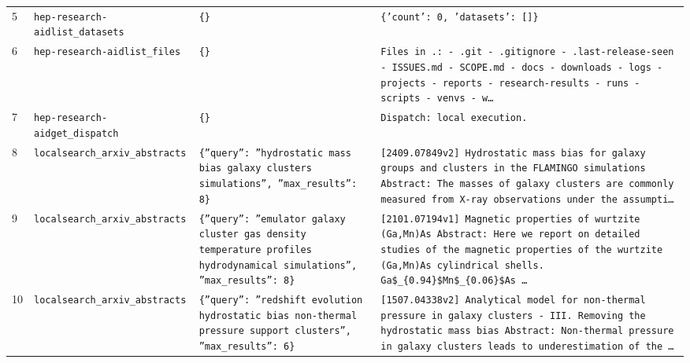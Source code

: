 \documentclass[11pt,a4paper]{article}
\begin{document}
\begin{longtable}{@{}p{}p{}p{}p{}@{}}
5 & \texttt{hep-research-aid}\newline\texttt{list\_\allowbreak{}datasets} & \texttt{\{\}\allowbreak{}} & \texttt{\{'count':\allowbreak{} 0,\allowbreak{} 'datasets':\allowbreak{} []\allowbreak{}\}\allowbreak{}} \\
6 & \texttt{hep-research-aid}\newline\texttt{list\_\allowbreak{}files} & \texttt{\{\}\allowbreak{}} & \texttt{Files in .:\allowbreak{}   - .git   - .gitignore   - .last-release-seen   - ISSUES.md   - SCOPE.md   - docs   - downloads   - logs   - projects   - reports   - research-results   - runs   - scripts   - venvs   - w\ldots{}\allowbreak{}} \\
7 & \texttt{hep-research-aid}\newline\texttt{get\_\allowbreak{}dispatch} & \texttt{\{\}\allowbreak{}} & \texttt{Dispatch:\allowbreak{} local execution.} \\
8 & \texttt{local}\newline\texttt{search\_\allowbreak{}arxiv\_\allowbreak{}abstracts} & \texttt{\{''query'':\allowbreak{} ''hydrostatic mass bias galaxy clusters simulations'',\allowbreak{} ''max\_\allowbreak{}results'':\allowbreak{} 8\}\allowbreak{}} & \texttt{[2409.07849v2]\allowbreak{} Hydrostatic mass bias for galaxy groups and clusters in the FLAMINGO simulations Abstract:\allowbreak{} The masses of galaxy clusters are commonly measured from X-ray observations under the assumpti\ldots{}\allowbreak{}} \\
9 & \texttt{local}\newline\texttt{search\_\allowbreak{}arxiv\_\allowbreak{}abstracts} & \texttt{\{''query'':\allowbreak{} ''emulator galaxy cluster gas density temperature profiles hydrodynamical simulations'',\allowbreak{} ''max\_\allowbreak{}results'':\allowbreak{} 8\}\allowbreak{}} & \texttt{[2101.07194v1]\allowbreak{} Magnetic properties of wurtzite (Ga,\allowbreak{}Mn)\allowbreak{}As Abstract:\allowbreak{} Here we report on detailed studies of the magnetic properties of the wurtzite (Ga,\allowbreak{}Mn)\allowbreak{}As cylindrical shells. Ga\$\_\allowbreak{}\{0.94\}\allowbreak{}\$Mn\$\_\allowbreak{}\{0.06\}\allowbreak{}\$As \ldots{}\allowbreak{}} \\
10 & \texttt{local}\newline\texttt{search\_\allowbreak{}arxiv\_\allowbreak{}abstracts} & \texttt{\{''query'':\allowbreak{} ''redshift evolution hydrostatic bias non-thermal pressure support clusters'',\allowbreak{} ''max\_\allowbreak{}results'':\allowbreak{} 6\}\allowbreak{}} & \texttt{[1507.04338v2]\allowbreak{} Analytical model for non-thermal pressure in galaxy clusters - III. Removing the hydrostatic mass bias Abstract:\allowbreak{} Non-thermal pressure in galaxy clusters leads to underestimation of the \ldots{}\allowbreak{}} \\

\end{longtable}
\end{document}
